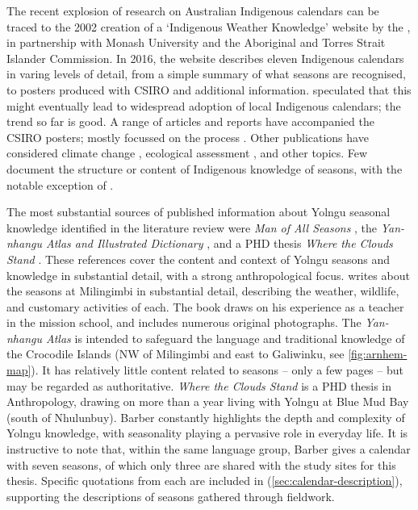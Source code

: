 The recent explosion of research on Australian Indigenous calendars can be
traced to the 2002 creation of a `Indigenous Weather Knowledge' website by the
\citet{BOM-iwk}, in partnership with Monash University and the Aboriginal and
Torres Strait Islander Commission.  In 2016, the website describes eleven
Indigenous calendars in varing levels of detail, from a simple summary of what
seasons are recognised, to posters produced with CSIRO and additional
information.  \citet{kingsley2003} speculated that this might eventually lead
to widespread adoption of local Indigenous calendars; the trend so far is good.
%
A range of articles and reports have accompanied the CSIRO posters; mostly
focussed on the process \citep[eg.][]{woodward2010,oconnor2010}.  Other
publications have considered climate change \citep[eg.][]{green2010a,green2010b},
ecological assessment \citep[eg.][]{ens2012,prober2011}, and other topics.
Few document the structure or content of Indigenous knowledge of seasons, with
the notable exception of \citet[eg.][]{woodward2012b}.


The most substantial sources of published information about Yolngu seasonal
knowledge identified in the literature review were \textit{Man of All Seasons}
\citep{davis1989}, the \textit{Yan-nhangu Atlas and Illustrated Dictionary}
\citep{atlas2014}, and a PHD thesis \textit{Where the Clouds Stand} \citep{barber2005}.
These references cover the content and context of Yolngu seasons and knowledge
in substantial detail, with a strong anthropological focus.
%
\citet{davis1989} writes about the seasons at Milingimbi in substantial detail,
describing the weather, wildlife, and customary activities of each.  The book
draws on his experience as a teacher in the mission school, and includes
numerous original photographs.
%
The \textit{Yan-nhangu Atlas} is intended to safeguard the language and
traditional knowledge of the Crocodile Islands (NW of Milingimbi and east
to Galiwinku, see \cref{fig:arnhem-map}).  It has relatively little content
related to seasons -- only a few pages -- but may be regarded as authoritative.
%
\textit{Where the Clouds Stand} is a PHD thesis in Anthropology, drawing on
more than a year living with Yolngu at Blue Mud Bay (south of Nhulunbuy).
Barber constantly highlights the depth and complexity of Yolngu knowledge,
with seasonality playing a pervasive role in everyday life.  It is instructive
to note that, within the same language group, Barber gives a calendar with
seven seasons, of which only three are shared with the study sites for this
thesis.
%
Specific quotations from each are included in 
(\cref{sec:calendar-description}), supporting the descriptions of seasons
gathered through fieldwork.

